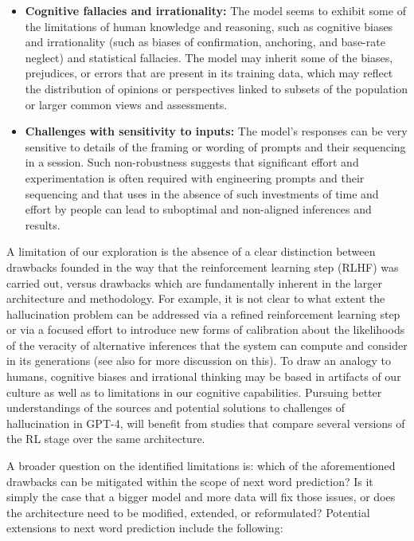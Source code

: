 \begin{itemize}
    \item \textbf{Cognitive fallacies and irrationality:} The model seems to exhibit some of the limitations of human knowledge and reasoning, such as cognitive biases and irrationality (such as biases of confirmation, anchoring, and base-rate neglect) and statistical fallacies. The model may inherit some of the biases, prejudices, or errors that are present in its training data, which may reflect the distribution of opinions or perspectives linked to subsets of the population or  larger common views and assessments. 
     \item \textbf{Challenges with sensitivity to inputs:} The model's responses can be very sensitive to details of the framing or wording of prompts and their sequencing in a session. Such non-robustness suggests that significant effort and experimentation is often required with engineering prompts and their sequencing and that uses in the absence of such investments of time and effort by people can lead to suboptimal and non-aligned inferences and results. 
\end{itemize}

A limitation of our exploration is the absence of a clear distinction between drawbacks founded in the way that the reinforcement learning step (RLHF) was carried out, versus drawbacks which are fundamentally inherent in the larger architecture and methodology. For example, it is not clear to what extent the hallucination problem can be addressed via a refined reinforcement learning step or via a focused effort to introduce new forms of calibration about the likelihoods of the veracity of alternative inferences that the system can compute and consider in its generations (see also \cite{gpt4} for more discussion on this). To draw an analogy to humans, cognitive biases and irrational thinking may be based in artifacts of our culture as well as to limitations in our cognitive capabilities. Pursuing better understandings of the sources and potential solutions to challenges of hallucination in GPT-4, will benefit from studies that compare several versions of the RL stage over the same architecture.

A broader question on the identified limitations is: which of the aforementioned drawbacks can be mitigated within the scope of next word prediction? Is it simply the case that a bigger model and more data will fix those issues, or does the architecture need to be modified, extended, or reformulated? Potential extensions to next word prediction include the following:

